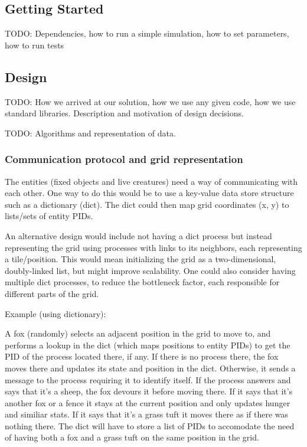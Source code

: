 \documentclass[12pt]{article}
\begin{document}
\subsection{Getting Started}

TODO: Dependencies, how to run a simple simulation, how to set parameters, how to run tests

\subsection{Design}

TODO: How we arrived at our solution, how we use any given code, how we use standard libraries. Description and motivation of design decisions.

TODO: Algorithms and representation of data.

\subsubsection{Communication protocol and grid representation}

The entities (fixed objects and live creatures) need a way of communicating with each other. One way to do this would be to use a key-value data store structure such as a dictionary (dict). The dict could then map grid coordinates (x, y) to lists/sets of entity PIDs.

An alternative design would include not having a dict process but instead representing the grid using processes with links to its neighbors, each representing a tile/position. 
This would mean initializing the grid as a two-dimensional, doubly-linked list, but might improve scalability. 
One could also consider having multiple dict processes, to reduce the bottleneck factor, each responsible for different parts of the grid.

Example (using dictionary):

A fox (randomly) selects an adjacent position in the grid to move to, and performs a lookup in the dict (which maps positions to entity PIDs) to get the PID of the process located there, if any. 
If there is no process there, the fox moves there and updates its state and position in the dict. 
Otherwise, it sends a message to the process requiring it to identify itself. 
If the process answers and says that it's a sheep, the fox devours it before moving there. 
If it says that it's another fox or a fence it stays at the current position and only updates hunger and similiar stats. 
If it says that it's a grass tuft it moves there as if there was nothing there. 
The dict will have to store a list of PIDs to accomodate the need of having both a fox and a grass tuft on the same position in the grid.
\end{document}
